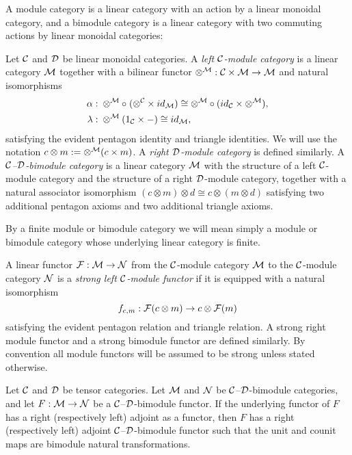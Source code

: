 \documentclass{amsart}
\begin{document}
A module category is a linear category with an action by a linear monoidal category, and a bimodule category is a linear category with two commuting actions by linear monoidal categories:
\begin{definition}
Let $\mathcal C$ and $\mathcal D$ be linear monoidal categories.
A \emph{left $\mathcal C$-module category} is a linear category $\mathcal M$ together with a bilinear functor $\otimes^{\mathcal M}: \mathcal C \times \mathcal M \to \mathcal M$ and natural isomorphisms
\begin{align*}
		\alpha: & \;    \otimes^{\mathcal M} \circ \; (\otimes^{\mathcal C} \times id_{\mathcal M}) \cong  \otimes^{\mathcal M} \circ (id_{\mathcal C} \times \otimes^{\mathcal M}), \\
		\lambda: & \; \otimes^{\mathcal M} (1_{\mathcal C} \times -) \cong id_{\mathcal M},
\end{align*}
satisfying the evident pentagon identity and triangle identities.  We will use the notation $c \otimes m := \otimes^\mathcal M(c \times m)$.  A \emph{right $\mathcal D$-module category} is defined similarly.  A \emph{$\mathcal C$--$\mathcal D$-bimodule category} is a linear category $\mathcal M$ with the structure of a left $\mathcal C$-module category and the structure of a right $\mathcal D$-module category, together with a natural associator isomorphism $(c \otimes m) \otimes d \cong c \otimes (m \otimes d)$ satisfying two additional pentagon axioms and two additional triangle axioms.  
\end{definition}
\nid By a finite module or bimodule category we will mean simply a module or bimodule category whose underlying linear category is finite. 

\begin{definition}
A linear functor $\mathcal F: \mathcal M \rightarrow \mathcal N$ from the $\mathcal C$-module category $\mathcal M$ to the $\mathcal C$-module category $\mathcal N$ is a \emph{strong left $\mathcal C$-module functor} if it is equipped with a natural isomorphism 
	\begin{equation*}
		f_{c,m}:\mathcal F(c \otimes m) \rightarrow c \otimes \mathcal F(m)
	\end{equation*}
	satisfying the evident pentagon relation and triangle relation.
	A strong right module functor and a strong bimodule functor are defined similarly.  By convention all module functors will be assumed to be strong unless stated otherwise.
\end{definition}

\begin{lemma} \label{lma:module-adjoint} \cite[\S 3.3]{EO-ftc}
Let $\mathcal C$ and $\mathcal D$ be tensor categories. Let  $\mathcal M$ and  $\mathcal N$  be  $\mathcal C$--$\mathcal D$-bimodule categories, and let $F: \mathcal M \to \mathcal N$ be a $\mathcal C$--$\mathcal D$-bimodule functor.  If the underlying functor of $F$ has a right (respectively left) adjoint as a functor, then $F$ has a right (respectively left) adjoint $\mathcal C$--$\mathcal D$-bimodule functor such that the unit and counit maps are bimodule natural transformations.
\end{lemma}
\end{document}
